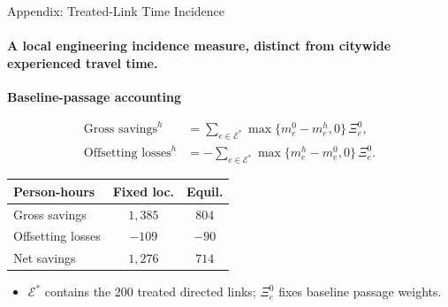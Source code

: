 \documentclass[11pt,aspectratio=169]{beamer}
\newcommand{\navback}[1]{\par\vspace{0.35em}\noindent\hfill\hyperlink{#1}{\beamerreturnbutton{back}}}
\begin{document}
\begin{frame}[label=apptreatedtime]{Appendix: Treated-Link Time Incidence}
\framesubtitle{A local engineering incidence measure, distinct from citywide experienced travel time.}
\footnotesize
\textbf{Baseline-passage accounting}\par
\vspace{0.10em}
\begin{align*}
\text{Gross savings}^{h}
  &=\sum_{e\in\mathcal E^*}\max\{m_e^0-m_e^h,0\}\,\Xi_e^0,\\
\text{Offsetting losses}^{h}
  &=-\sum_{e\in\mathcal E^*}\max\{m_e^h-m_e^0,0\}\,\Xi_e^0.
\end{align*}
\vspace{-0.45em}
\begin{center}
\renewcommand{\arraystretch}{1.18}
\begin{tabular}{lcc}
\toprule
Person-hours & Fixed loc. & Equil. \\
\midrule
Gross savings & $1{,}385$ & $804$ \\
Offsetting losses & $-109$ & $-90$ \\
Net savings & $1{,}276$ & $714$ \\
\bottomrule
\end{tabular}
\end{center}
\vspace{0.15em}
\begin{itemize}\scriptsize\setlength\itemsep{0.25em}
  \item $\mathcal E^*$ contains the 200 treated directed links; $\Xi_e^0$ fixes baseline passage weights.
\end{itemize}
\navback{result2}
\end{frame}
\end{document}
